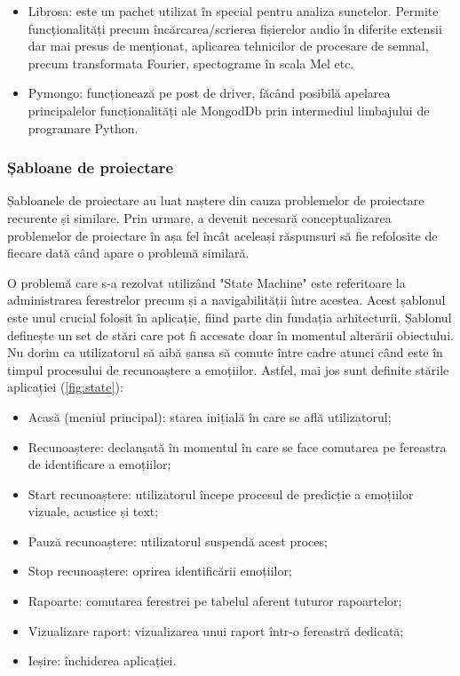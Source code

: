 \documentclass[a4paper, 12pt]{report}
\begin{document}
\begin{itemize}
		\item Librosa: este un pachet utilizat în special pentru analiza sunetelor. Permite funcționalități precum încărcarea/scrierea fișierelor audio în diferite extensii dar mai presus de menționat, aplicarea tehnicilor de procesare de semnal, precum transformata Fourier, spectograme în scala Mel etc.
	
		\item Pymongo: funcționează pe post de driver, făcând posibilă apelarea principalelor funcționalități ale MongodDb prin intermediul limbajului de programare Python.
	\end{itemize}
	
	\subsubsection{Șabloane de proiectare}
	Șabloanele de proiectare au luat naștere din cauza problemelor de proiectare recurente și similare. Prin urmare, a devenit necesară conceptualizarea problemelor de proiectare în așa fel încât aceleași răspunsuri să fie refolosite de fiecare dată când apare o problemă similară.

	O problemă care s-a rezolvat utilizând  "State Machine" este referitoare la administrarea ferestrelor precum și a navigabilității între acestea. Acest șablonul este unul crucial folosit în aplicație, fiind parte din fundația arhitecturii. Șablonul definește un set de stări care pot fi accesate doar în momentul alterării obiectului. Nu dorim ca utilizatorul să aibă șansa să comute între cadre atunci când este în timpul procesului de recunoaștere a emoțiilor. Astfel, mai jos sunt definite stările aplicației (\ref{fig:state}): 
	
	\begin{itemize}
		\item Acasă (meniul principal): starea inițială în care se află utilizatorul;
		\item Recunoaștere: declanșată în momentul în care se face comutarea pe fereastra de identificare a emoțiilor;
		\item Start recunoaștere: utilizatorul începe procesul de predicție a emoțiilor vizuale, acustice și text;
		\item Pauză recunoaștere: utilizatorul suspendă acest proces;
		\item Stop recunoaștere: oprirea identificării emoțiilor;
		\item Rapoarte: comutarea ferestrei pe tabelul aferent tuturor rapoartelor;
		\item Vizualizare raport: vizualizarea unui raport într-o fereastră dedicată;
		\item Ieșire: închiderea aplicației.
	\end{itemize}
	
\end{document}
